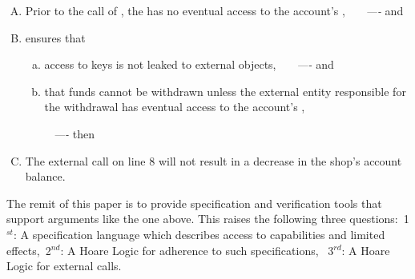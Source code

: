 \vspace{.05cm}
\begin{enumerate}[(A)]
\item   Prior to the call of  , the   has no eventual access to the account's \password, \ \ \ \emph{----} and
\item  \Mshop ensures that 
\begin{enumerate}[(a)]
\item access to keys is not leaked to external objects, \ \ \ \emph{----} and
\item    that  funds cannot be withdrawn unless the external entity responsible for the withdrawal has eventual access to the account's \password,
\end{enumerate}
\ \  \ \ \ \emph{----} then
\item  The external  call on line 8 will not result  in a decrease in the shop's account balance.
\end{enumerate}



\noindent
The remit of this paper is to provide specification and verification tools that support arguments like the one above.
This raises the following three questions:\  1$^{st}$:  A specification language which describes access to capabilities and limited effects,\ 
2$^{nd}$: A  Hoare Logic for adherence to such specifications,  \ 3$^{rd}$:    A  Hoare Logic for external calls.

%
%


%
%




